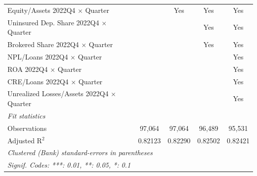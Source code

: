\begin{tabular}{lcccc}
   Equity/Assets 2022Q4 $\times$ Quarter          &                 & Yes             & Yes             & Yes\\  
   Uninsured Dep. Share 2022Q4 $\times$ Quarter       &                 &                 & Yes             & Yes\\  
   Brokered Share 2022Q4 $\times$ Quarter         &                 &                 & Yes             & Yes\\  
   NPL/Loans 2022Q4 $\times$ Quarter              &                 &                 &                 & Yes\\  
   ROA 2022Q4 $\times$ Quarter                     &                 &                 &                 & Yes\\  
   CRE/Loans 2022Q4 $\times$ Quarter       &                 &                 &                 & Yes\\  
   Unrealized Losses/Assets 2022Q4 $\times$ Quarter    &                 &                 &                 & Yes\\  
   \midrule
   \emph{Fit statistics}\\
   Observations                            & 97,064          & 97,064          & 96,489          & 95,531\\  
   Adjusted R$^2$                          & 0.82123         & 0.82290         & 0.82502         & 0.82421\\  
   \midrule \midrule
   \multicolumn{5}{l}{\emph{Clustered (Bank) standard-errors in parentheses}}\\
   \multicolumn{5}{l}{\emph{Signif. Codes: ***: 0.01, **: 0.05, *: 0.1}}\\
\end{tabular}
\par\endgroup



